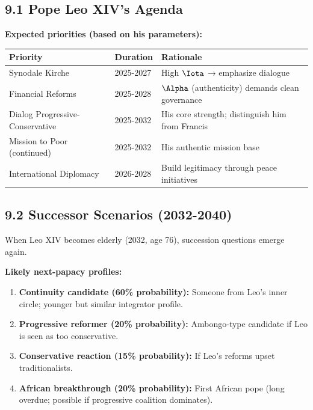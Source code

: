 \subsection{9.1 Pope Leo XIV's Agenda}

\textbf{Expected priorities (based on his parameters):}

\begin{table}[h]
\centering
\begin{tabular}{|l|l|l|}
\hline
\textbf{Priority} & \textbf{Duration} & \textbf{Rationale} \\
\hline
Synodale Kirche & 2025-2027 & High $\Iota$ → emphasize dialogue \\
Financial Reforms & 2025-2028 & $\Alpha$ (authenticity) demands clean governance \\
Dialog Progressive-Conservative & 2025-2032 & His core strength; distinguish him from Francis \\
Mission to Poor (continued) & 2025-2032 & His authentic mission base \\
International Diplomacy & 2026-2028 & Build legitimacy through peace initiatives \\
\hline
\end{tabular}
\end{table}

\subsection{9.2 Successor Scenarios (2032-2040)}

When Leo XIV becomes elderly (2032, age 76), succession questions emerge again.

\textbf{Likely next-papacy profiles:}

\begin{enumerate}
\item \textbf{Continuity candidate (60\% probability):} Someone from Leo's inner circle; younger but similar integrator profile.

\item \textbf{Progressive reformer (20\% probability):} Ambongo-type candidate if Leo is seen as too conservative.

\item \textbf{Conservative reaction (15\% probability):} If Leo's reforms upset traditionalists.

\item \textbf{African breakthrough (20\% probability):} First African pope (long overdue; possible if progressive coalition dominates).
\end{enumerate}

